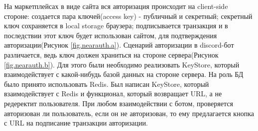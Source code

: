На маркетплейсах в виде сайта вся авторизация происходит на client-side стороне: создается пара ключей(access key) - публичный и секретный; секретный ключ сохраняется в local storage браузера; подписывается транзакция и в последствии этот ключ будет использован сайтом, для подтверждения авторизации(Рисунок {\color{blue} \ref{fig.nearauth.a}}). Сценарий авторизации в discord-бот различается, ведь ключ должен храниться на стороне сервера(Рисунок {\color{blue} \ref{fig.nearauth.b}}). Для этого были необходимо реализовать KeyStore, который взаимодействует с какой-нибудь базой данных на стороне сервера. На роль БД было принято использовать Redis. Был написан KeyStore, который взаимодействует с Redis и функционал, который возвращает URL, а не редеректит пользователя. При любом взаимодействии с ботом, проверяется авторизован ли пользователь, если он не авторизован, то ему предлагается кнопка с URL на подписание транзакции авторизации.

\begin{figure}
	\centering
    \caption{}
\end{figure}

